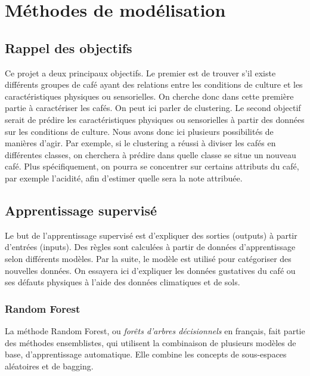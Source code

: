 
\chapter{Méthodes de modélisation}
\section{Rappel des objectifs}\label{obj}
Ce projet a deux principaux objectifs. Le premier est de trouver s'il existe différents groupes de café ayant des relations entre les conditions de culture et les caractéristiques physiques ou sensorielles. On cherche donc dans cette première partie à caractériser les cafés. On peut ici parler de clustering.  Le second objectif serait de prédire les caractéristiques physiques ou sensorielles à partir des données sur les conditions de culture. Nous avons donc ici plusieurs possibilités de manières d'agir. Par exemple, si le clustering a réussi à diviser les cafés en différentes classes, on cherchera à prédire dans quelle classe se situe un nouveau café. Plus spécifiquement, on pourra se concentrer sur certains attributs du café, par exemple l'acidité, afin d'estimer quelle sera la note attribuée. 



\newpage

\section{Apprentissage supervisé}
Le but de l'apprentissage supervisé est d'expliquer des sorties (outputs) à partir d'entrées (inputs). Des règles sont calculées à partir de données d'apprentissage selon différents modèles. Par la suite, le modèle est utilisé pour catégoriser des nouvelles données. On essayera ici d'expliquer les données gustatives du café ou ses défauts physiques à l'aide des données climatiques et de sols. 


\subsection{Random Forest}

La méthode Random Forest, ou \textit{forêts d'arbres décisionnels} en français, fait partie des méthodes ensemblistes\cite{EnsembleMethods}, qui utilisent la combinaison de plusieurs modèles de base, d'apprentissage automatique. Elle combine les concepts de sous-espaces aléatoires et de bagging.\\

